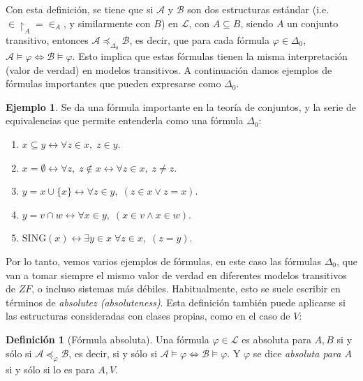 \documentclass[11pt,a4paper]{book}
\theoremstyle{plain}
\theoremstyle{definition}
\newtheorem{definicion}[teorema]{Definición}
\newtheorem{ejemplo}[teorema]{Ejemplo}
\theoremstyle{remark}
\begin{document}
Con esta definición, se tiene que si $\mathcal{A}$ y $\mathcal{B}$ son dos estructuras estándar (i.e. $\in \!\upharpoonright_{A} = \in _A$, y similarmente con $B$) en $\mathcal{L}$, con $A \subseteq B$, siendo $A$ un conjunto transitivo, entonces $\mathcal{A} \preceq_{\Delta_0} \mathcal{B}$, es decir, que para cada fórmula $\varphi \in \Delta_0$, $\mathcal{A} \models \varphi \iff \mathcal{B} \models \varphi$. Esto implica que estas fórmulas tienen la misma interpretación (valor de verdad) en modelos transitivos. A continuación damos ejemplos de fórmulas importantes que pueden expresarse como $\Delta_0$.

\begin{ejemplo}

  Se da una fórmula importante en la teoría de conjuntos, y la serie de equivalencias que permite entenderla como una fórmula $\Delta_0$:

  \begin{enumerate}

    \item $x \subseteq y \leftrightarrow \forall z \in x, \; z \in y$.
    
    \item $x = \emptyset \leftrightarrow \forall z, \; z \notin x \leftrightarrow \forall z \in x, \; z \ne z$.
    
    \item $y = x \cup \{x\} \leftrightarrow \forall z \in y, \; (z \in x \vee z = x)$.
    
    \item $y = v \cap w \leftrightarrow \forall x \in y, \; (x \in v \wedge x \in w)$.
    
    \item $\text{SING}(x) \leftrightarrow \exists y \in x \; \forall z \in x, \; (z = y)$.

  \end{enumerate}

\end{ejemplo}

Por lo tanto, vemos varios ejemplos de fórmulas, en este caso las fórmulas $\Delta_0$, que van a tomar siempre el mismo valor de verdad en diferentes modelos transitivos de $ZF$, o incluso sistemas más débiles. Habitualmente, esto se suele escribir en términos de \textit{absolutez (absoluteness)}. Esta definición también puede aplicarse si las estructuras consideradas con clases propias, como en el caso de $V$:

\begin{definicion}[Fórmula absoluta]
  Una fórmula $\varphi \in \mathcal{L}$ es absoluta para $A, B$ si y sólo si $\mathcal{A} \preceq_{\varphi} \mathcal{B}$, es decir, si y sólo si $\mathcal{A} \models \varphi \iff \mathcal{B} \models \varphi$. Y $\varphi$ se dice \textit{absoluta para $A$} si y sólo si lo es para $A, V$.
\end{definicion}
\end{document}
